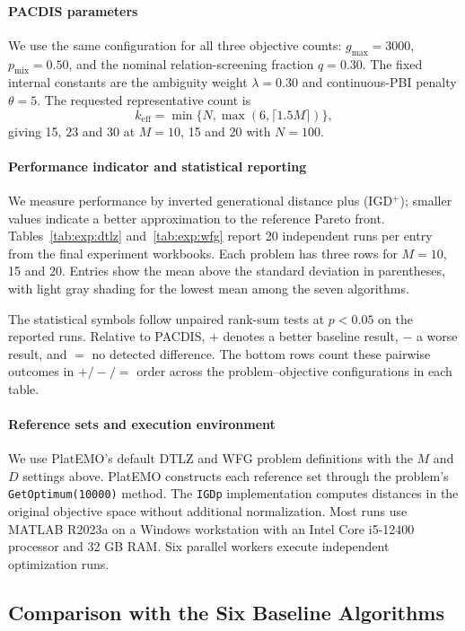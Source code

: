 \documentclass[final,5p,times,twocolumn]{elsarticle}
\begin{document}
\paragraph{PACDIS parameters}
We use the same configuration for all three objective counts:
$g_{\max}=3000$, $p_{\mathrm{mix}}=0.50$, and the nominal relation-screening
fraction $q=0.30$. The fixed internal constants are the ambiguity weight
$\lambda=0.30$ and continuous-PBI penalty $\theta=5$.
The requested representative count is
\begin{equation}
k_{\mathrm{eff}}=\min\{N,\max(6,\lceil1.5M\rceil)\},
\label{eq:keff}
\end{equation}
giving 15, 23 and 30 at $M=10$, 15 and 20 with $N=100$.

\paragraph{Performance indicator and statistical reporting}
We measure performance by inverted generational distance plus (IGD$^+$);
smaller values indicate a better approximation to the reference Pareto front.
Tables~\ref{tab:exp:dtlz} and~\ref{tab:exp:wfg} report 20 independent runs per
entry from the final experiment workbooks. Each problem has three rows for
$M=10$, 15 and 20. Entries show the mean above the standard deviation in
parentheses, with light gray shading for the lowest mean among the seven
algorithms.

The statistical symbols follow unpaired rank-sum tests at $p<0.05$ on the
reported runs. Relative to PACDIS,
$+$ denotes a better baseline result, $-$ a worse result, and $=$ no detected
difference. The bottom rows count these pairwise outcomes in $+/-/=$ order
across the problem--objective configurations in each table.

\paragraph{Reference sets and execution environment}
We use PlatEMO's default DTLZ and WFG problem definitions with the $M$ and $D$
settings above. PlatEMO constructs each reference set through the problem's
\texttt{GetOptimum(10000)} method. The \texttt{IGDp} implementation computes
distances in the original objective space without additional normalization.
Most runs use MATLAB R2023a on a Windows workstation with an Intel Core
i5-12400 processor and 32 GB RAM. Six parallel workers execute independent
optimization runs.

\subsection{Comparison with the Six Baseline Algorithms}
\label{sec:exp:comparison}
\end{document}
